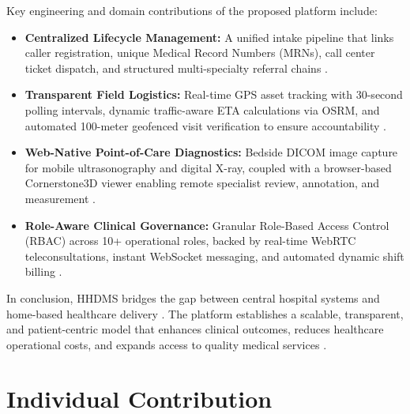 \documentclass[lettersize,onecolumn,journal]{IEEEtran}
\begin{document}
	Key engineering and domain contributions of the proposed platform include:
	\begin{itemize}
		\item \textbf{Centralized Lifecycle Management:} A unified intake pipeline that links caller registration, unique Medical Record Numbers (MRNs), call center ticket dispatch, and structured multi-specialty referral chains \cite{srs2026}.
		\item \textbf{Transparent Field Logistics:} Real-time GPS asset tracking with 30-second polling intervals, dynamic traffic-aware ETA calculations via OSRM, and automated 100-meter geofenced visit verification to ensure accountability \cite{zandbergen2009accuracy, haversine_formula, osrm_routing}.
		\item \textbf{Web-Native Point-of-Care Diagnostics:} Bedside DICOM image capture for mobile ultrasonography and digital X-ray, coupled with a browser-based Cornerstone3D viewer enabling remote specialist review, annotation, and measurement \cite{dicom2021, pacs2001, cornerstone3d}.
		\item \textbf{Role-Aware Clinical Governance:} Granular Role-Based Access Control (RBAC) across 10+ operational roles, backed by real-time WebRTC teleconsultations, instant WebSocket messaging, and automated dynamic shift billing \cite{rbac_standard, fette2011websocket, stripe2024api, agorawebrtc}.
	\end{itemize}
	
	In conclusion, HHDMS bridges the gap between central hospital systems and home-based healthcare delivery \cite{srs2026}. The platform establishes a scalable, transparent, and patient-centric model that enhances clinical outcomes, reduces healthcare operational costs, and expands access to quality medical services \cite{telemedicine_homecare}.
	
	
	
	
	
	
	   
	{\tiny
		
	}
	\vfill
	
	\newpage
	\section*{Individual Contribution}
	
\end{document}
